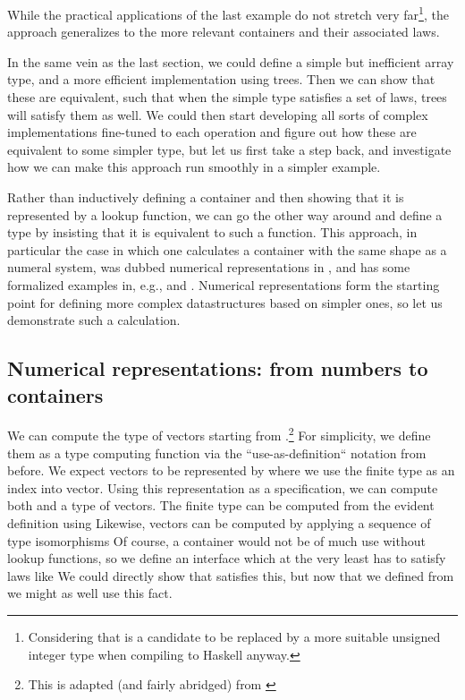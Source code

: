 While the practical applications of the last example do not stretch very far\footnote{Considering that  is a candidate to be replaced by a more suitable unsigned integer type when compiling to Haskell anyway.}, the approach generalizes to the more relevant containers and their associated laws.

In the same vein as the last section, we could define a simple but inefficient array type, and a more efficient implementation using trees. Then we can show that these are equivalent, such that when the simple type satisfies a set of laws, trees will satisfy them as well. We could then start developing all sorts of complex implementations fine-tuned to each operation and figure out how these are equivalent to some simpler type, but let us first take a step back, and investigate how we can make this approach run smoothly in a simpler example.

Rather than inductively defining a container and then showing that it is represented by a lookup function, we can go the other way around and define a type by insisting that it is equivalent to such a function. This approach, in particular the case in which one calculates a container with the same shape as a numeral system, was dubbed numerical representations in \cite{purelyfunctional}, and has some formalized examples in, e.g., \cite{calcdata} and \cite{progorn}. Numerical representations form the starting point for defining more complex datastructures based on simpler ones, so let us demonstrate such a calculation. 

\subsection{Numerical representations: from numbers to containers}\label{ssec:numrep}
We can compute the type of vectors starting from \bN{}.\footnote{This is adapted (and fairly abridged) from \cite{calcdata}} For simplicity, we define them as a type computing function via the ``use-as-definition`` notation from before. We expect vectors to be represented by 
where we use the finite type  as an index into vector. Using this representation as a specification, we can compute both  and a type of vectors. The finite type can be computed from the evident definition
using
Likewise, vectors can be computed by applying a sequence of type isomorphisms
Of course, a container would not be of much use without lookup functions, so we define an interface
which at the very least has to satisfy laws like
We could directly show that  satisfies this, but now that we defined  from  we might as well use this fact.

